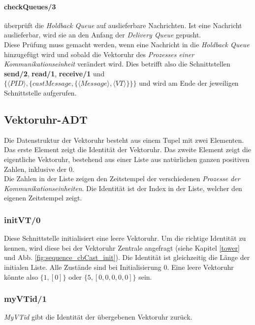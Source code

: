 \paragraph{checkQueues/3} überprüft die \textit{Holdback Queue} auf auslieferbare Nachrichten. Ist eine Nachricht auslieferbar, wird sie an den Anfang der \textit{Delivery Queue} gepusht.\\
Diese Prüfung muss gemacht werden, wenn eine Nachricht in die \textit{Holdback Queue} hinzugefügt wird und sobald die Vektoruhr des \textit{Prozesses einer Kommunikationseinheit} verändert wird. Dies betrifft also die Schnittstellen \textbf{send/2}, \textbf{read/1}, \textbf{receive/1} und\\ $\{\langle PID \rangle,\{castMessage,\{\langle Message \rangle, \langle VT \rangle\}\}\}$ und wird am Ende der jeweiligen Schnittstelle aufgerufen.

\subsection{Vektoruhr-ADT} \label{vectorC_entwurf}

Die Datenstruktur der Vektoruhr besteht aus einem Tupel mit zwei Elementen. Das erste Element zeigt die Identität der Vektoruhr. Das zweite Element zeigt die eigentliche Vektoruhr, bestehend aus einer Liste aus natürlichen ganzen positiven Zahlen, inklusive der 0.\\
Die Zahlen in der Liste zeigen den Zeitstempel der verschiedenen \textit{Prozesse der Kommunikationseinheiten}. Die Identität ist der Index in der Liste, welcher den eigenen Zeitstempel zeigt.

\subsubsection{initVT/0}

Diese Schnittstelle initialisiert eine leere Vektoruhr. Um die richtige Identität zu kennen, wird diese bei der Vektoruhr Zentrale angefragt (siehe Kapitel \ref{tower} und Abb. \ref{fig:sequence_cbCast_init}). Die Identität ist gleichzeitig die Länge der initialen Liste. Alle Zustände sind bei Initialisierung 0. Eine leere Vektoruhr könnte also $\{1, [0]\}$ oder $\{5, [0,0,0,0,0]\}$ sein.

\subsubsection{myVTid/1}

\textit{MyVTid} gibt die Identität der übergebenen Vektoruhr zurück. 

